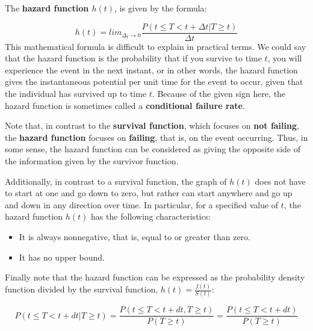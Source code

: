 \documentclass[]{book}
\makeatletter
\newenvironment{Shaded}{\begin{snugshade}}{\end{snugshade}}
\newcommand{\KeywordTok}[1]{\textcolor[rgb]{0.13,0.29,0.53}{\textbf{#1}}}
\newcommand{\DataTypeTok}[1]{\textcolor[rgb]{0.13,0.29,0.53}{#1}}
\newcommand{\DecValTok}[1]{\textcolor[rgb]{0.00,0.00,0.81}{#1}}
\newcommand{\StringTok}[1]{\textcolor[rgb]{0.31,0.60,0.02}{#1}}
\newcommand{\OtherTok}[1]{\textcolor[rgb]{0.56,0.35,0.01}{#1}}
\newcommand{\OperatorTok}[1]{\textcolor[rgb]{0.81,0.36,0.00}{\textbf{#1}}}
\newcommand{\NormalTok}[1]{#1}
\newenvironment{kframe}{%
\medskip{}
\setlength{\fboxsep}{.8em}
 \def\at@end@of@kframe{}%
 \ifinner\ifhmode%
  \def\at@end@of@kframe{\end{minipage}}%
  \begin{minipage}{\columnwidth}%
 \fi\fi%
 \def\FrameCommand##1{\hskip\@totalleftmargin \hskip-\fboxsep
 \colorbox{shadecolor}{##1}\hskip-\fboxsep
     \hskip-\linewidth \hskip-\@totalleftmargin \hskip\columnwidth}%
 \MakeFramed {\advance\hsize-\width
   \@totalleftmargin\z@ \linewidth\hsize
   \@setminipage}}%
 {\par\unskip\endMakeFramed%
 \at@end@of@kframe}
\renewenvironment{Shaded}{\begin{kframe}}{\end{kframe}}
\theoremstyle{definition}
\theoremstyle{definition}
\theoremstyle{definition}
\theoremstyle{remark}
\makeatother
\begin{document}
The \textbf{hazard function \(h(t)\)}, is given by the formula:

\[
h(t) = \displaystyle{lim_{\Delta_t \to 0}} \frac{P(t \le T < t + \Delta t | T \ge t)}{\Delta t}
\] This mathematical formula is difficult to explain in practical terms.
We could say that the hazard function is the probability that if you
survive to time \(t\), you will experience the event in the next
instant, or in other words, the hazard function gives the instantaneous
potential per unit time for the event to occur, given that the
individual has survived up to time \(t\). Because of the given sign
here, the hazard function is sometimes called a \textbf{conditional
failure rate}.

Note that, in contrast to the \textbf{survival function}, which focuses
on \textbf{not failing}, the \textbf{hazard function} focuses on
\textbf{failing}, that is, on the event occurring. Thus, in some sense,
the hazard function can be considered as giving the opposite side of the
information given by the survivor function.

Additionally, in contrast to a survival function, the graph of \(h(t)\)
does not have to start at one and go down to zero, but rather can start
anywhere and go up and down in any direction over time. In particular,
for a specified value of \(t\), the hazard function \(h(t)\) has the
following characteristics:

\begin{itemize}
\item
  It is always nonnegative, that is, equal to or greater than zero.
\item
  It has no upper bound.
\end{itemize}

Finally note that the hazard function can be expressed as the
probability density function divided by the survival function,
\(h(t) = \frac{f(t)}{S(t)}\):

\[
P(t \le T \lt t + dt | T \ge t) = \frac{P(t \le T \lt t + dt, T \ge t)}{P(T \ge t)} = \frac{P(t \le T \lt t + dt)}{P(T \ge t)}
\]

\begin{Shaded}
\end{Shaded}
\end{document}
